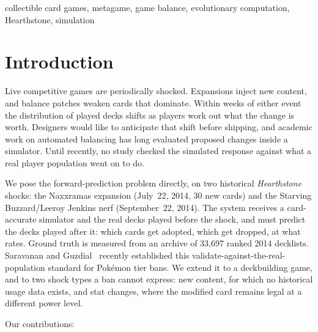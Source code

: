\documentclass[conference]{IEEEtran}
\begin{document}
\begin{IEEEkeywords}
collectible card games, metagame, game balance, evolutionary computation,
Hearthstone, simulation
\end{IEEEkeywords}

\section{Introduction}

Live competitive games are periodically shocked. Expansions inject
new content, and balance patches weaken cards that dominate. Within
weeks of either event the distribution of played decks shifts as
players work out what the change is worth. Designers would like to
anticipate that shift before shipping, and academic work on automated
balancing has long evaluated proposed changes inside a simulator.
Until recently, no study checked the simulated response against what
a real player population went on to do.

We pose the forward-prediction problem directly, on two historical
\emph{Hearthstone} shocks: the Naxxramas expansion (July~22, 2014,
30 new cards) and the Starving Buzzard/Leeroy Jenkins nerf
(September~22, 2014). The system receives a card-accurate simulator
and the real decks played before the shock, and must predict the
decks played after it: which cards get adopted, which get dropped,
at what rates. Ground truth is measured from an archive of 33{,}697 ranked
2014 decklists. Saravanan and Guzdial~\cite{saravanan2024meta}
recently established this validate-against-the-real-population
standard for Pok\'emon tier bans. We extend it to a deckbuilding
game, and to two shock types a ban cannot express: new content, for
which no historical usage data exists, and stat changes, where the
modified card remains legal at a different power level.

Our contributions:
\end{document}
